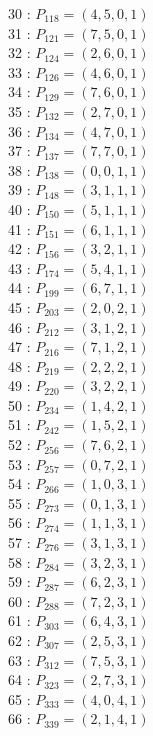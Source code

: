 \documentclass{article}
\begin{document}
{\begin{multicols}{3}
30 : $P_{118}=( 4, 5, 0, 1 )$\\
31 : $P_{121}=( 7, 5, 0, 1 )$\\
32 : $P_{124}=( 2, 6, 0, 1 )$\\
33 : $P_{126}=( 4, 6, 0, 1 )$\\
34 : $P_{129}=( 7, 6, 0, 1 )$\\
35 : $P_{132}=( 2, 7, 0, 1 )$\\
36 : $P_{134}=( 4, 7, 0, 1 )$\\
37 : $P_{137}=( 7, 7, 0, 1 )$\\
38 : $P_{138}=( 0, 0, 1, 1 )$\\
39 : $P_{148}=( 3, 1, 1, 1 )$\\
40 : $P_{150}=( 5, 1, 1, 1 )$\\
41 : $P_{151}=( 6, 1, 1, 1 )$\\
42 : $P_{156}=( 3, 2, 1, 1 )$\\
43 : $P_{174}=( 5, 4, 1, 1 )$\\
44 : $P_{199}=( 6, 7, 1, 1 )$\\
45 : $P_{203}=( 2, 0, 2, 1 )$\\
46 : $P_{212}=( 3, 1, 2, 1 )$\\
47 : $P_{216}=( 7, 1, 2, 1 )$\\
48 : $P_{219}=( 2, 2, 2, 1 )$\\
49 : $P_{220}=( 3, 2, 2, 1 )$\\
50 : $P_{234}=( 1, 4, 2, 1 )$\\
51 : $P_{242}=( 1, 5, 2, 1 )$\\
52 : $P_{256}=( 7, 6, 2, 1 )$\\
53 : $P_{257}=( 0, 7, 2, 1 )$\\
54 : $P_{266}=( 1, 0, 3, 1 )$\\
55 : $P_{273}=( 0, 1, 3, 1 )$\\
56 : $P_{274}=( 1, 1, 3, 1 )$\\
57 : $P_{276}=( 3, 1, 3, 1 )$\\
58 : $P_{284}=( 3, 2, 3, 1 )$\\
59 : $P_{287}=( 6, 2, 3, 1 )$\\
60 : $P_{288}=( 7, 2, 3, 1 )$\\
61 : $P_{303}=( 6, 4, 3, 1 )$\\
62 : $P_{307}=( 2, 5, 3, 1 )$\\
63 : $P_{312}=( 7, 5, 3, 1 )$\\
64 : $P_{323}=( 2, 7, 3, 1 )$\\
65 : $P_{333}=( 4, 0, 4, 1 )$\\
66 : $P_{339}=( 2, 1, 4, 1 )$\\

\end{multicols}}
\end{document}
